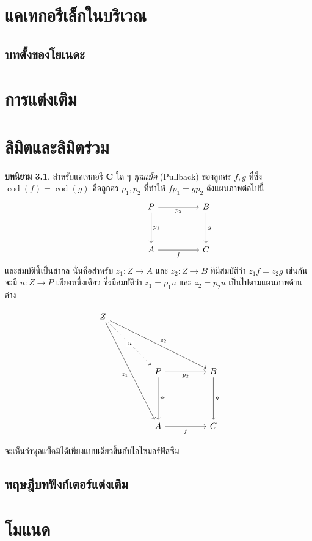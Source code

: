 \documentclass[a4paper,12pt]{extbook}
\theoremstyle{definition}
\newtheorem{definition}{บทนิยาม}[chapter]
\theoremstyle{remark}
\DeclareMathOperator{\cod}{cod}
\begin{document}
		\chapter{แคเทกอรีเล็กในบริเวณ}
		\section{บทตั้งของโยเนดะ}
		
		\chapter{การแต่งเติม}
		
		\chapter{ลิมิตและลิมิตร่วม}
		
		\begin{definition}
			สำหรับแคเทกอรี $\mathbf C$ ใด ๆ \textit{พุลแบ็ค} (Pullback) ของลูกศร $f, g$ ที่ซึ่ง $\cod(f) = \cod(g)$
			คือลูกศร $p_1, p_2$ ที่ทำให้ $fp_1 = gp_2$ ดังแผนภาพต่อไปนี้
			\begin{equation*}
			\begin{tikzcd}[column sep = huge, row sep=huge]
			& P \arrow[d, "p_1"] \arrow[r, "p_2"'] & B \arrow[d, "g"] \\
			& A \arrow[r, "f"']                    & C               
			\end{tikzcd}
			\end{equation*}
			 และสมบัตินี้เป็นสากล นั่นคือสำหรับ $z_1\colon Z \to A$ และ $z_2\colon Z \to B$ ที่มีสมบัติว่า $z_1f = z_2g$ เช่นกัน จะมี $u \colon Z \to P$ เพียงหนึ่งเดียว ซึ่งมีสมบัติว่า $z_1 = p_1u$ และ $z_2 = p_2u$ เป็นไปตามแผนภาพด้านล่าง
			 
			\begin{equation*}
			\begin{tikzcd}[column sep = huge, row sep=5.0em]
				Z \arrow[rd, "u" description, dotted] \arrow[rrd, "z_2"] \arrow[rdd, "z_1"'] &                                      &                  \\
				& P \arrow[d, "p_1"] \arrow[r, "p_2"'] & B \arrow[d, "g"] \\
				& A \arrow[r, "f"']                    & C               
			\end{tikzcd}
			\end{equation*}
		\end{definition}
		จะเห็นว่าพุลแบ็คมีได้เพียงแบบเดียวขึ้นกับไอโซมอร์ฟิสซึม
		
		\section{ทฤษฎีบทฟังก์เตอร์แต่งเติม}
		
		\chapter{โมแนด}
\end{document}
